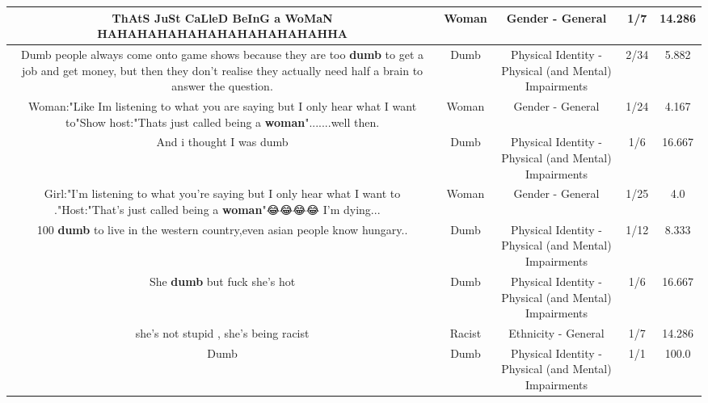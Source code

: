 \documentclass[11pt]{article}
\newlength\mylength
\begin{document}
\begin{center}
\begin{longtable}{|C{.65\mylength}|C{.30\mylength}|C{.12\mylength}|C{.12\mylength}|C{.12\mylength}|}
  \small ThAtS JuSt CaLleD BeInG a \textbf{WoMaN} HAHAHAHAHAHAHAHAHAHAHAHHA\normalsize   & Woman & Gender - General & 1/7 & 14.286 \\  \hline
  \small Dumb people always come onto game shows because they are too \textbf{dumb} to get a job and get money, but then they don't realise they actually need half a brain to answer the question.\normalsize   & Dumb & Physical Identity - Physical (and Mental) Impairments & 2/34 & 5.882 \\  \hline
  \small Woman:"Like Im listening to what you are saying but I only hear what I want to"Show host:"Thats just called being a \textbf{woman}".......well then.\normalsize   & Woman & Gender - General & 1/24 & 4.167 \\  \hline
  \small And i thought I was dumb\normalsize   & Dumb & Physical Identity - Physical (and Mental) Impairments & 1/6 & 16.667 \\  \hline
  \small Girl:"I'm listening to what you're saying but I only hear what I want to ."Host:"That's just called being a \textbf{woman}"😂😂😂😂 I'm dying... 🤣🤣\normalsize   & Woman & Gender - General & 1/25 & 4.0 \\  \hline
  \small 100 \textbf{dumb} to live in the western country,even asian people know hungary..\normalsize   & Dumb & Physical Identity - Physical (and Mental) Impairments & 1/12 & 8.333 \\  \hline
  \small She \textbf{dumb} but fuck she's hot\normalsize   & Dumb & Physical Identity - Physical (and Mental) Impairments & 1/6 & 16.667 \\  \hline
  \small she's not stupid , she's being racist\normalsize   & Racist & Ethnicity - General & 1/7 & 14.286 \\  \hline
  \small Dumb\normalsize   & Dumb & Physical Identity - Physical (and Mental) Impairments & 1/1 & 100.0 \\  \hline

\end{longtable}
\end{center}
\end{document}
